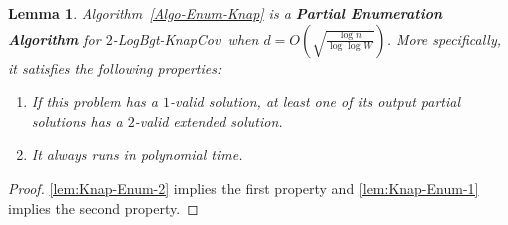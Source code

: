 \documentclass[11pt,a4paper]{article} \usepackage{enumitem}
\newcommand{\LBOknapcov}{\textsf{LogBgt-KnapCov}}
\newtheorem{lemma}[theorem]{Lemma}
\theoremstyle{definition}
\begin{document}
\begin{lemma}
Algorithm~\ref{Algo-Enum-Knap} is a \textbf{Partial Enumeration Algorithm} for $2$-\LBOknapcov\ when $d=O(\sqrt{\frac{\log n}{\log\log W}})$. More specifically, it satisfies the following properties:

\begin{enumerate}

\item If this problem has a $1$-valid solution, at least one of its output partial solutions has a $2$-valid extended solution.

\item It always runs in polynomial time.

\end{enumerate}
\end{lemma}
\begin{proof}
\cref{lem:Knap-Enum-2} implies the first property and \cref{lem:Knap-Enum-1} implies the second property.
\end{proof}
\end{document}
